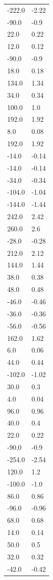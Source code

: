 \begin{longtable}{ll}
-222.0 & -2.22 \\
-90.0 & -0.9 \\
22.0 & 0.22 \\
12.0 & 0.12 \\
-90.0 & -0.9 \\
18.0 & 0.18 \\
134.0 & 1.34 \\
34.0 & 0.34 \\
100.0 & 1.0 \\
192.0 & 1.92 \\
8.0 & 0.08 \\
192.0 & 1.92 \\
-14.0 & -0.14 \\
-14.0 & -0.14 \\
-34.0 & -0.34 \\
-104.0 & -1.04 \\
-144.0 & -1.44 \\
242.0 & 2.42 \\
260.0 & 2.6 \\
-28.0 & -0.28 \\
212.0 & 2.12 \\
144.0 & 1.44 \\
38.0 & 0.38 \\
48.0 & 0.48 \\
-46.0 & -0.46 \\
-36.0 & -0.36 \\
-56.0 & -0.56 \\
162.0 & 1.62 \\
6.0 & 0.06 \\
44.0 & 0.44 \\
-102.0 & -1.02 \\
30.0 & 0.3 \\
4.0 & 0.04 \\
96.0 & 0.96 \\
40.0 & 0.4 \\
22.0 & 0.22 \\
-90.0 & -0.9 \\
-254.0 & -2.54 \\
120.0 & 1.2 \\
-100.0 & -1.0 \\
86.0 & 0.86 \\
-96.0 & -0.96 \\
68.0 & 0.68 \\
14.0 & 0.14 \\
50.0 & 0.5 \\
32.0 & 0.32 \\
-42.0 & -0.42 \\

\end{longtable}
